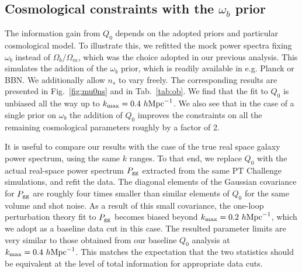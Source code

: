 \documentclass[12pt,a4paper]{article}
\newcommand\hMpc{h\text{Mpc}^{-1}}
\begin{document}
\subsection{Cosmological constraints with the $\omega_b$ prior}

The information gain from $Q_0$ 
depends on the adopted priors and particular cosmological model. To illustrate this, 
we refitted the mock power spectra 
fixing $\omega_b$ instead of $\Omega_b/\Omega_{m}$,
which was the choice adopted in our previous analysis.
This simulates the addition of the $\omega_b$ prior, which is readily available in e.g. Planck or BBN.
 We additionally allow $n_s$ to vary freely. 
The corresponding results are presented in Fig.~\ref{fig:mu0ns} and in Tab.~\ref{tab:ob}.
 We find that the fit to $Q_0$ is unbiased all the way up to $k_{\rm max}=0.4~\hMpc$.
 We also see that in the case of a single prior on $\omega_b$ the addition of $Q_0$
 improves the constraints on all the remaining cosmological parameters roughly 
 by a factor of 2. 

It is useful to compare our results with the case of the true real space galaxy power spectrum, using the same $k$ ranges.
To that end, we replace $Q_0$ with the actual 
real-space power spectrum $P_{\rm gg}$ extracted from the same PT Challenge simulations, and refit the data.
The diagonal elements of the Gaussian covariance for $P_{\rm gg}$ are roughly four times smaller than similar elements of $Q_0$ for the same volume and shot noise.
As a result of this small covariance, the one-loop perturbation theory fit to $P_{\rm gg}$ becomes 
biased beyond 
$k_{\rm max}=0.2~\hMpc$, which we adopt 
as a baseline data cut in this case.
The resulted parameter limits are very similar to those obtained 
from our baseline $Q_0$ analysis at $k_{\rm max}=0.4~\hMpc$. 
This matches the expectation 
that the two statistics should be equivalent 
at the level of total information 
for appropriate data cuts.
\end{document}
